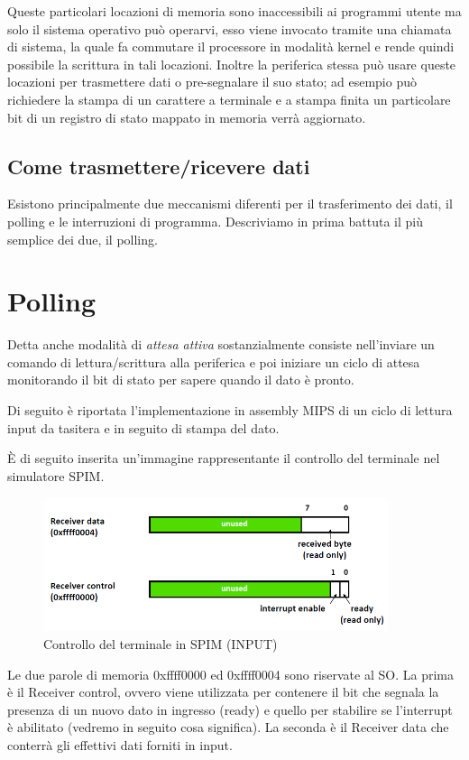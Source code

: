 \documentclass[class=book, crop=false, oneside]{standalone}
\begin{document}
Queste particolari locazioni di memoria sono inaccessibili ai programmi utente ma solo il sistema operativo può operarvi, esso viene invocato tramite una chiamata di sistema, la quale fa commutare il processore in modalità kernel e rende quindi possibile la scrittura in tali locazioni.
Inoltre la periferica stessa può usare queste locazioni per trasmettere dati o pre-segnalare il suo stato; ad esempio può richiedere la stampa di un carattere a terminale e a stampa finita un particolare bit di un registro di stato mappato in memoria verrà aggiornato.

\subsection{Come trasmettere/ricevere dati}
Esistono principalmente due meccanismi diferenti per il trasferimento dei dati, il polling e le interruzioni di programma.
Descriviamo in prima battuta il più semplice dei due, il polling.

\section{Polling}
Detta anche modalità di \emph{attesa attiva} sostanzialmente consiste nell'inviare un comando di lettura/scrittura alla periferica e poi iniziare un ciclo di attesa monitorando il bit di stato per sapere quando il dato è pronto.

Di seguito è riportata l'implementazione in assembly MIPS di un ciclo di lettura input da tasitera e in seguito di stampa del dato.

È di seguito inserita un'immagine rappresentante il controllo del terminale nel simulatore SPIM.
\begin{figure}[!h]
	\centering
	\includegraphics[width=0.9\textwidth,keepaspectratio]{SPIM1}
	\caption{Controllo del terminale in SPIM (INPUT)}
\end{figure}

Le due parole di memoria 0xffff0000 ed 0xffff0004 sono riservate al SO.
La prima è il Receiver control, ovvero viene utilizzata per contenere il bit che segnala la presenza di un nuovo dato in ingresso (ready) e quello per stabilire se l'interrupt è abilitato (vedremo in seguito cosa significa).
La seconda è il Receiver data che conterrà gli effettivi dati forniti in input.
\end{document}
